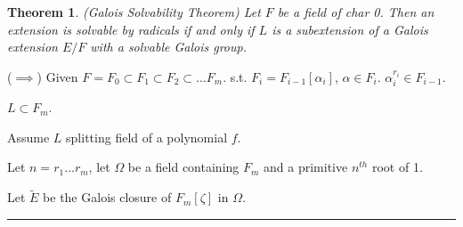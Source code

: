 \documentclass[twoside]{article}
\newcounter{lecnum}
\newcommand{\z}{\zeta}
\newtheorem{theorem}{Theorem}[lecnum]
\newenvironment{proof}{{\bf Proof:}}{\hfill\rule{2mm}{2mm}}
\begin{document}
    \begin{theorem}(Galois Solvability Theorem)
        Let $F$ be a field of char 0. Then an extension is solvable by radicals if and only if $L$ is a subextension of a Galois extension $E/F$ with a solvable Galois group.
    \end{theorem}

    \begin{proof}
        ($\implies$) Given $F = F_0 \subset F_1 \subset F_2 \subset \dots F_m$. s.t. $F_i = F_{i-1}[\alpha_i]$, $\alpha \in F_i$.         $\alpha_i^{r_i} \in F_{i-1}$. 

        $L \subset F_m$. 

        Assume $L$ splitting field of a polynomial $f$. 


        Let $n = r_1\dots r_m$, let $\Omega$ be a field containing $F_m$ and a primitive $n^{th}$ root of 1.  

        Let $\tilde E $ be the Galois closure of $F_m[\z]$ in $\Omega$. 

    \end{proof}
\end{document}
